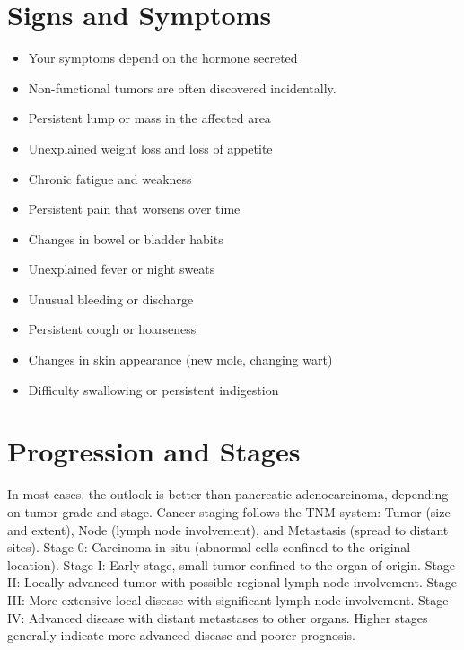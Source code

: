 \section{Signs and Symptoms}
\begin{itemize}[noitemsep]
  \item Your symptoms depend on the hormone secreted
  \item Non-functional tumors are often discovered incidentally.
  \item Persistent lump or mass in the affected area
  \item Unexplained weight loss and loss of appetite
  \item Chronic fatigue and weakness
  \item Persistent pain that worsens over time
  \item Changes in bowel or bladder habits
  \item Unexplained fever or night sweats
  \item Unusual bleeding or discharge
  \item Persistent cough or hoarseness
  \item Changes in skin appearance (new mole, changing wart)
  \item Difficulty swallowing or persistent indigestion
\end{itemize}
\section{Progression and Stages}
In most cases, the outlook is better than pancreatic adenocarcinoma, depending on tumor grade and stage. Cancer staging follows the TNM system: Tumor (size and extent), Node (lymph node involvement), and Metastasis (spread to distant sites). Stage 0: Carcinoma in situ (abnormal cells confined to the original location). Stage I: Early-stage, small tumor confined to the organ of origin. Stage II: Locally advanced tumor with possible regional lymph node involvement. Stage III: More extensive local disease with significant lymph node involvement. Stage IV: Advanced disease with distant metastases to other organs. Higher stages generally indicate more advanced disease and poorer prognosis.
